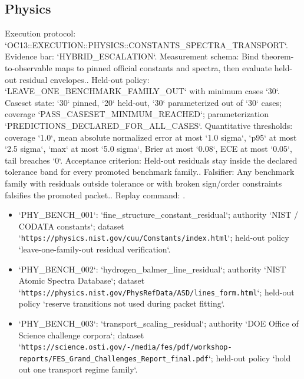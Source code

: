 \subsection{Physics}
Execution protocol: `OC13::EXECUTION::PHYSICS::CONSTANTS\_SPECTRA\_TRANSPORT`. Evidence bar: `HYBRID\_ESCALATION`.
Measurement schema: Bind theorem-to-observable maps to pinned official constants and spectra, then evaluate held-out residual envelopes..
Held-out policy: `LEAVE\_ONE\_BENCHMARK\_FAMILY\_OUT` with minimum cases `30`.
Caseset state: `30` pinned, `20` held-out, `30` parameterized out of `30` cases; coverage `PASS\_CASESET\_MINIMUM\_REACHED`; parameterization `PREDICTIONS\_DECLARED\_FOR\_ALL\_CASES`.
Quantitative thresholds: coverage `1.0`, mean absolute normalized error at most `1.0 sigma`, `p95` at most `2.5 sigma`, `max` at most `5.0 sigma`, Brier at most `0.08`, ECE at most `0.05`, tail breaches `0`.
Acceptance criterion: Held-out residuals stay inside the declared tolerance band for every promoted benchmark family..
Falsifier: Any benchmark family with residuals outside tolerance or with broken sign/order constraints falsifies the promoted packet..
Replay command: .
\begin{itemize}
\item `PHY\_BENCH\_001`: `fine\_structure\_constant\_residual`; authority `NIST / CODATA constants`; dataset `\texttt{https://physics.nist.gov/cuu/Constants/index.html}`; held-out policy `leave-one-family-out residual verification`.
\item `PHY\_BENCH\_002`: `hydrogen\_balmer\_line\_residual`; authority `NIST Atomic Spectra Database`; dataset `\texttt{https://physics.nist.gov/PhysRefData/ASD/lines\_form.html}`; held-out policy `reserve transitions not used during packet fitting`.
\item `PHY\_BENCH\_003`: `transport\_scaling\_residual`; authority `DOE Office of Science challenge corpora`; dataset `\texttt{https://science.osti.gov/-/media/fes/pdf/workshop-reports/FES\_Grand\_Challenges\_Report\_final.pdf}`; held-out policy `hold out one transport regime family`.
\end{itemize}

